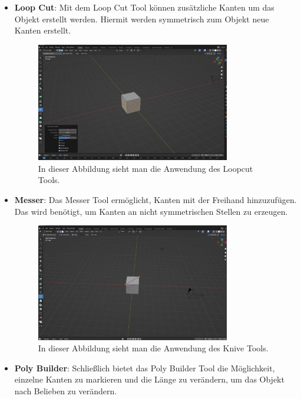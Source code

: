 \begin{itemize}
    \item \textbf{Loop Cut}:
    \indent Mit dem Loop Cut Tool können zusätzliche Kanten um das Objekt erstellt werden. Hiermit werden symmetrisch zum Objekt neue Kanten erstellt.
    \begin{figure}[H]
        \centering
        \includegraphics[width=0.8\textwidth]{chapters/13/images/Loopcut.png}
        \caption{In dieser Abbildung sieht man die Anwendung des Loopcut Tools.}
        \label{UST-11}
    \end{figure}
    \item \textbf{Messer}:
    \indent Das Messer Tool ermöglicht, Kanten mit der Freihand hinzuzufügen. Das wird benötigt, um Kanten an nicht symmetrischen Stellen zu erzeugen.
    \begin{figure}[H]
        \centering
        \includegraphics[width=0.8\textwidth]{chapters/13/images/KniveTool.png}
        \caption{In dieser Abbildung sieht man die Anwendung des Knive Tools.}
        \label{UST-12}
    \end{figure}
    \item \textbf{Poly Builder}: 
    \indent Schließlich bietet das Poly Builder Tool die Möglichkeit, einzelne Kanten zu markieren und die Länge zu verändern, um das Objekt nach Belieben zu verändern.
    \begin{figure}[H]

\end{figure}
\end{itemize}
